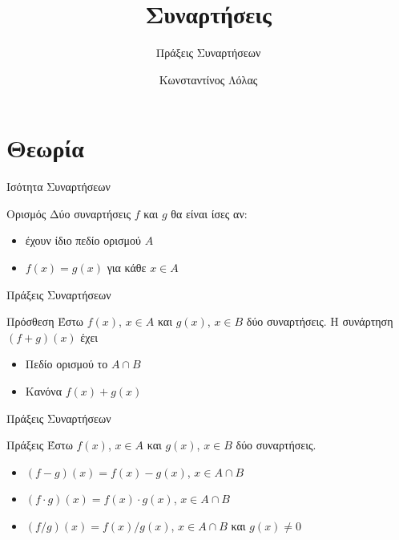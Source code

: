 \documentclass{presentation}
\title{Συναρτήσεις}
\subtitle{Πράξεις Συναρτήσεων}
\author[Λόλας]{Κωνσταντίνος Λόλας }
\institute[$10^ο$ ΓΕΛ]{$10^ο$ ΓΕΛ Θεσσαλονίκης}
\begin{document}
\begin{frame}
  \titlepage
\end{frame}

\section{Θεωρία}

\begin{frame}{Ισότητα Συναρτήσεων}
  \begin{block}{Ορισμός}
    Δύο συναρτήσεις $f$ και $g$ θα είναι ίσες αν:
    \begin{itemize}
      \item έχουν ίδιο πεδίο ορισμού $Α$
      \item $f(x)=g(x)$ για κάθε $x\in Α$
    \end{itemize}
  \end{block}
\end{frame}

\begin{frame}{Πράξεις Συναρτήσεων}
  \begin{block}{Πρόσθεση}
    Έστω $f(x)$, $x\in Α$ και $g(x)$, $x\in Β$ δύο συναρτήσεις. Η συνάρτηση $(f+g)(x)$ έχει
    \begin{itemize}
      \item Πεδίο ορισμού το $Α\cap Β$
      \item Κανόνα $f(x)+g(x)$
    \end{itemize}
  \end{block}
\end{frame}

\begin{frame}{Πράξεις Συναρτήσεων}
  \begin{block}{Πράξεις}
    Έστω $f(x)$, $x\in Α$ και $g(x)$, $x\in Β$ δύο συναρτήσεις.
    \begin{itemize}[<+->]
      \item $(f-g)(x)=f(x)-g(x)$, $x\in Α\cap Β$
      \item $(f\cdot g)(x)=f(x)\cdot g(x)$, $x\in Α\cap Β$
      \item $(f/g)(x)=f(x)/g(x)$, $x\in Α\cap Β$ και $g(x)\ne 0$
    \end{itemize}
  \end{block}
\end{frame}
\end{document}
